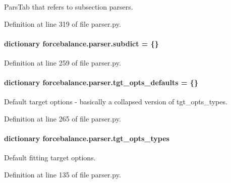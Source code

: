 Pars\-Tab that refers to subsection parsers. 



Definition at line 319 of file parser.\-py.

\hypertarget{namespaceforcebalance_1_1parser_abb7a7e9723de629aa97727a85bcdbad1}{
\paragraph[{subdict}]{\setlength{\rightskip}{0pt plus 5cm}dictionary forcebalance.\-parser.\-subdict = \{\}}}\label{namespaceforcebalance_1_1parser_abb7a7e9723de629aa97727a85bcdbad1}


Definition at line 259 of file parser.\-py.

\hypertarget{namespaceforcebalance_1_1parser_aff4922444f06b7334a0994a835607393}{
\paragraph[{tgt\-\_\-opts\-\_\-defaults}]{\setlength{\rightskip}{0pt plus 5cm}dictionary forcebalance.\-parser.\-tgt\-\_\-opts\-\_\-defaults = \{\}}}\label{namespaceforcebalance_1_1parser_aff4922444f06b7334a0994a835607393}


Default target options -\/ basically a collapsed version of tgt\-\_\-opts\-\_\-types. 



Definition at line 265 of file parser.\-py.

\hypertarget{namespaceforcebalance_1_1parser_a95436b7fb9e99bd7b9f0a040b15fbe3a}{
\paragraph[{tgt\-\_\-opts\-\_\-types}]{\setlength{\rightskip}{0pt plus 5cm}dictionary forcebalance.\-parser.\-tgt\-\_\-opts\-\_\-types}}\label{namespaceforcebalance_1_1parser_a95436b7fb9e99bd7b9f0a040b15fbe3a}


Default fitting target options. 



Definition at line 135 of file parser.\-py.

